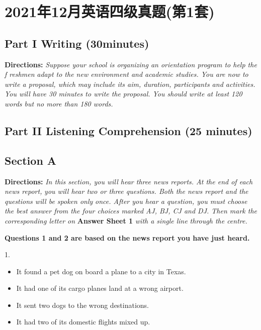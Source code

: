 \documentclass[UTF8,11pt]{ctexart}
\begin{document}
\section*{2021年12月英语四级真题(第1套)}
\subsection*{\textbf{Part }I \textbf{Writing} \textbf{(30minutes)}}


\textbf{Directions: }\textit{Suppose your school is organizing an orientation program to help the f reshmen} \textit{adapt to the new environment and academic studies. You are now to write a proposal, which} \textit{may include its aim, duration, participants and activities. You will have 30 minutes to write the} \textit{proposal. You should write at least 120 words but no more than 180 words.}


\subsection*{\textbf{Part }II \textbf{Listening Comprehension} \textbf{(25 minutes)}}


\subsection*{\textbf{Section A}}


\textbf{Directions: }\textit{In this section, you will hear three news reports. At the end of each news report,} \textit{you will hear two or three questions. Both the news report and the questions will be spoken only} \textit{once. After you hear a question, you must choose the best answer from the four choices marked} \textit{AJ, BJ, CJ and DJ. Then mark the corresponding letter on }\textbf{Answer Sheet 1 }\textit{with a single line} \textit{through the centre.}


\textbf{Questions 1 and 2 are based on the news report you have just heard.}


1.


\begin{itemize}[leftmargin=2em,itemsep=.2em,topsep=.4em]\item[A.] It found a pet dog on board a plane to a city in Texas.
\item[B.] It had one of its cargo planes land at a wrong airport.
\item[C.] It sent two dogs to the wrong destinations.
\item[D.] It had two of its domestic flights mixed up.
\end{itemize}
\end{document}
